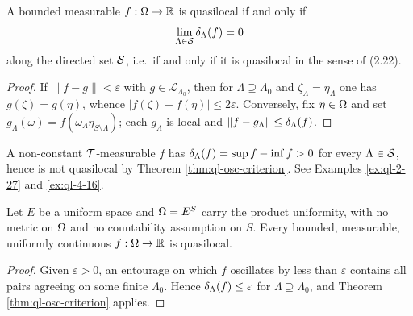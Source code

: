 \begin{theorem}
    \label{thm:ql-osc-criterion}
    \leanok

    A bounded measurable $f : \Omega \to \mathbb{R}$ is quasilocal if and only if
    \[\lim_{\Lambda \in \mathcal{S}} \delta_\Lambda(f) = 0\]
    along the directed set $\mathcal{S}$, i.e.\ if and only if it is quasilocal in the sense of (2.22).
\end{theorem}
\begin{proof}
    \leanok

    If $\|f - g\| < \varepsilon$ with $g \in \mathcal{L}_{\Lambda_0}$, then for $\Lambda \supseteq
    \Lambda_0$ and $\zeta_\Lambda = \eta_\Lambda$ one has $g(\zeta) = g(\eta)$, whence
    $|f(\zeta) - f(\eta)| \le 2\varepsilon$. Conversely, fix $\eta \in \Omega$ and set
    $g_\Lambda(\omega) = f(\omega_\Lambda \eta_{S\setminus\Lambda})$; each $g_\Lambda$ is local
    and $\|f - g_\Lambda\| \le \delta_\Lambda(f)$.
\end{proof}

\begin{remark}
    \label{rmk:ql-tail-not-quasilocal}
    A non-constant $\mathcal{T}$-measurable $f$ has $\delta_\Lambda(f) = \sup f - \inf f > 0$ for every
    $\Lambda \in \mathcal{S}$, hence is not quasilocal by Theorem \ref{thm:ql-osc-criterion}. See
    Examples \ref{ex:ql-2-27} and \ref{ex:ql-4-16}.
\end{remark}

\begin{proposition}
    \label{prop:ql-unif-cont}
    \leanok

    Let $E$ be a uniform space and $\Omega = E^S$ carry the product uniformity, with no metric on
    $\Omega$ and no countability assumption on $S$. Every bounded, measurable, uniformly continuous
    $f : \Omega \to \mathbb{R}$ is quasilocal.
\end{proposition}
\begin{proof}
    \leanok

    Given $\varepsilon > 0$, an entourage on which $f$ oscillates by less than $\varepsilon$
    contains all pairs agreeing on some finite $\Lambda_0$. Hence $\delta_\Lambda(f) \le \varepsilon$
    for $\Lambda \supseteq \Lambda_0$, and Theorem \ref{thm:ql-osc-criterion} applies.
\end{proof}

